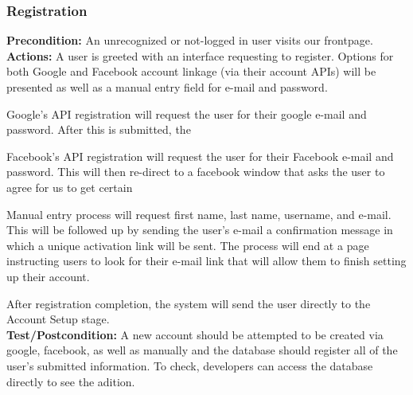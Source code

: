 \documentclass[a4paper,12pt]{article}
\begin{document}
\subsubsection{Registration}
\textbf{Precondition:} An unrecognized or not-logged in user visits our frontpage.\\
\textbf{Actions:} A user is greeted with an interface requesting to register.  Options for both Google and Facebook account linkage (via their account APIs) will be presented as well as a manual entry field for e-mail and password. \begin{list}{•}{•}
\item Google's API registration will request the user for their google e-mail and password.  After this is submitted, the
\item Facebook's API registration will request the user for their Facebook e-mail and password.  This will then re-direct to a facebook window that asks the user to agree for us to get certain 
\item Manual entry process will request first name, last name, username, and e-mail.  This will be followed up by sending the user's e-mail a confirmation message in which a unique activation link will be sent.  The process will end at a page instructing users to look for their e-mail link that will allow them to finish setting up their account.
\end{list}
After registration completion, the system will send the user directly to the Account Setup stage.\\
\textbf{Test/Postcondition:} A new account should be attempted to be created via google, facebook, as well as manually and the database should register all of the user's submitted information.  To check, developers can access the database directly to see the adition.
\end{document}
